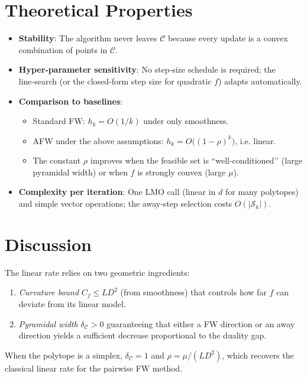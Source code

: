 \documentclass{article}
\newcommand{\C}{\mathcal{C}}
\begin{document}
\section*{Theoretical Properties}
\begin{itemize}
\item \textbf{Stability}: The algorithm never leaves $\C$ because every update is a convex combination of points in $\C$.
\item \textbf{Hyper‑parameter sensitivity}: No step‑size schedule is required; the line‑search (or the closed‑form step size for quadratic $f$) adapts automatically.
\item \textbf{Comparison to baselines}:
    \begin{itemize}
        \item Standard FW: $h_{k}=O(1/k)$ under only smoothness.
        \item AFW under the above assumptions: $h_{k}=O\bigl((1-\rho)^{k}\bigr)$, i.e. linear.
        \item The constant $\rho$ improves when the feasible set is “well‑conditioned’’ (large pyramidal width) or when $f$ is strongly convex (large $\mu$).
    \end{itemize}
\item \textbf{Complexity per iteration}: One LMO call (linear in $d$ for many polytopes) and simple vector operations; the away‑step selection costs $O(|\mathcal{S}_{k}|)$.
\end{itemize}

\section*{Discussion}
The linear rate relies on two geometric ingredients:
\begin{enumerate}
\item \emph{Curvature bound} $C_{f}\le L D^{2}$ (from smoothness) that controls how far $f$ can deviate from its linear model.
\item \emph{Pyramidal width} $\delta_{\C}>0$ guaranteeing that either a FW direction or an away direction yields a sufficient decrease proportional to the duality gap.
\end{enumerate}
When the polytope is a simplex, $\delta_{\C}=1$ and $\rho=\mu/(L D^{2})$, which recovers the classical linear rate for the pairwise FW method.
\end{document}
